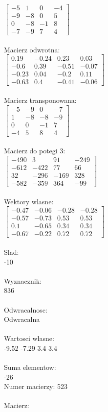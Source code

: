 \documentclass[a4paper,12pt]{article}
\begin{document}
$\begin{bmatrix} -5&1&0&-4\\-9&-8&0&5\\0&-8&-1&8\\-7&-9&7&4 \end{bmatrix}$
\\
\\
Macierz odwrotna:\\

$\begin{bmatrix} 0.19&-0.24&0.23&0.03\\-0.6&0.39&-0.51&-0.07\\-0.23&0.04&-0.2&0.11\\-0.63&0.4&-0.41&-0.06 \end{bmatrix}$
\\
\\
Macierz transponowana:\\

$\begin{bmatrix} -5&-9&0&-7\\1&-8&-8&-9\\0&0&-1&7\\-4&5&8&4 \end{bmatrix}$
\\
\\
Macierz do potegi 3:\\

$\begin{bmatrix} -490&3&91&-249\\-612&-422&77&66\\32&-296&-169&328\\-582&-359&364&-99 \end{bmatrix}$
\\
\\
Wektory wlasne:\\

$\begin{bmatrix} -0.47&-0.06&-0.28&-0.28\\-0.57&-0.73&0.53&0.53\\0.1&-0.65&0.34&0.34\\-0.67&-0.22&0.72&0.72 \end{bmatrix}$
\\
\\
Slad:\\
-10
\\
\\
Wyznacznik:\\
836
\\
\\
Odwracalnosc:\\
Odwracalna
\\
\\
Wartosci wlasne:\\
-9.52 -7.29 3.4 3.4
\\
\\
Suma elementow:\\
-26
\\
\newpage
Numer macierzy:
523
\\
\\
Macierz:\\
\end{document}
